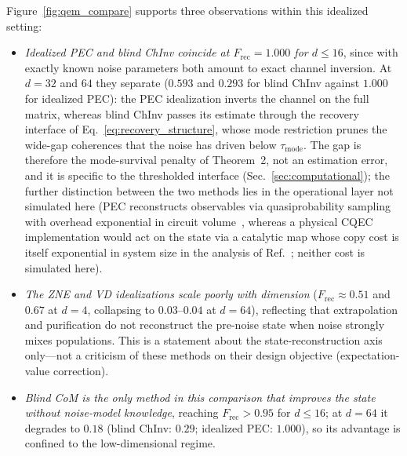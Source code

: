 \documentclass[12pt,a4paper]{article}
\newcommand{\Frec}{F_\mathrm{rec}}
\begin{document}
Figure~\ref{fig:qem_compare} supports three observations within this idealized setting:
\begin{itemize}
\item \emph{Idealized PEC and blind ChInv coincide at $\Frec = 1.000$ for $d \leq 16$}, since with exactly known noise parameters both amount to exact channel inversion.
At $d = 32$ and $64$ they separate ($0.593$ and $0.293$ for blind ChInv against $1.000$ for idealized PEC): the PEC idealization inverts the channel on the full matrix, whereas blind ChInv passes its estimate through the recovery interface of Eq.~\eqref{eq:recovery_structure}, whose mode restriction prunes the wide-gap coherences that the noise has driven below $\tau_\mathrm{mode}$.
The gap is therefore the mode-survival penalty of Theorem~2, not an estimation error, and it is specific to the thresholded interface (Sec.~\ref{sec:computational}); the further distinction between the two methods lies in the operational layer not simulated here (PEC reconstructs observables via quasiprobability sampling with overhead exponential in circuit volume~\cite{Temme2017,Endo2018,Takagi2022limits,Quek2024tighter}, whereas a physical CQEC implementation would act on the state via a catalytic map whose copy cost is itself exponential in system size in the analysis of Ref.~\cite{Wakaura2026unified}; neither cost is simulated here).
\item \emph{The ZNE and VD idealizations scale poorly with dimension} ($\Frec \approx 0.51$ and $0.67$ at $d = 4$, collapsing to $0.03$--$0.04$ at $d = 64$), reflecting that extrapolation and purification do not reconstruct the pre-noise state when noise strongly mixes populations.
This is a statement about the state-reconstruction axis only---not a criticism of these methods on their design objective (expectation-value correction).
\item \emph{Blind CoM is the only method in this comparison that improves the state without noise-model knowledge}, reaching $\Frec > 0.95$ for $d \leq 16$; at $d = 64$ it degrades to $0.18$ (blind ChInv: $0.29$; idealized PEC: $1.000$), so its advantage is confined to the low-dimensional regime.
\end{itemize}
\end{document}
